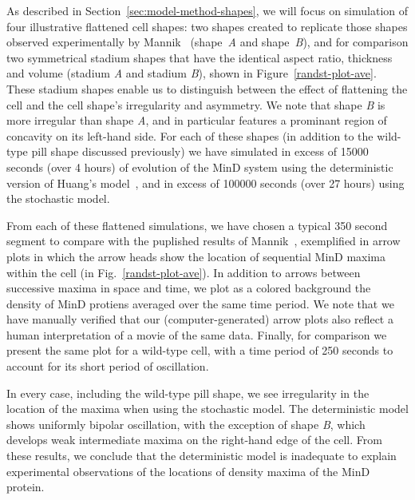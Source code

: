 \documentclass[letterpaper,twocolumn,amsmath,amssymb,pre]{revtex4-1}
\newcommand{\red}[1]{{\bf \color{red} #1}}
\newcommand{\fixme}[1]{\red{[#1]}}
\begin{document}
As described in Section~\ref{sec:model-method-shapes}, we will focus
on simulation of four illustrative flattened cell shapes: two shapes
created to replicate those shapes observed experimentally by
Mannik~\cite{mannik2012robustness} (shape~\emph{A} and
shape~\emph{B}), and for comparison two symmetrical stadium shapes
that have the identical aspect ratio, thickness and volume (stadium
\emph{A} and stadium \emph{B}), shown in Figure~\ref{randst-plot-ave}.
These stadium shapes enable us to distinguish between the effect of
flattening the cell and the cell shape's irregularity and asymmetry.
We note that shape \emph{B} is more irregular than shape \emph{A}, and
in particular features a prominant region of concavity on its
left-hand side.  For each of these shapes (in addition to the
wild-type pill shape discussed previously) we have simulated in excess
of 15000 seconds (over 4 hours) of evolution of the MinD system using
the deterministic version of Huang's model~\cite{huang2003dynamic},
and in excess of 100000 seconds (over 27 hours) using the stochastic
model.

From each of these flattened simulations, we have chosen a typical 350
second segment to compare with the puplished results of
Mannik~\cite{mannik2012robustness}, exemplified in arrow plots in
which the arrow heads show the location of sequential MinD maxima
within the cell (in Fig.~\ref{randst-plot-ave}).  In addition to
arrows between successive maxima in space and time, we plot as a
colored background the density of MinD protiens averaged over the same
time period.  We note that we have manually verified that our
(computer-generated) arrow plots also reflect a human interpretation
of a movie of the same data.  Finally, for comparison we present the
same plot for a wild-type cell, with a time period of 250 seconds to
account for its short period of oscillation.

In every case, including the wild-type pill shape, we see irregularity
in the location of the maxima when using the stochastic model.  The
deterministic model shows uniformly bipolar oscillation, with the
exception of shape \emph{B}, which develops weak intermediate maxima
on the right-hand edge of the cell.  From these results, we conclude
that the deterministic model is inadequate to explain experimental
observations of the locations of density maxima of the MinD protein.


\end{document}

